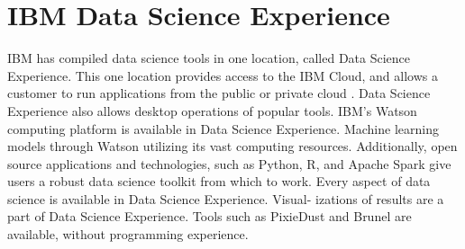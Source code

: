 \section{IBM Data Science Experience}

IBM has compiled data science tools in one location, 
called Data Science Experience. This one location provides
access to the IBM Cloud, and allows a customer to run 
applications from the public or private cloud 
\cite{hid-sp18-525-dsx}.
Data Science Experience also allows desktop operations 
of popular tools\cite{hid-sp18-525-dsx}.
IBM's Watson computing platform is available in Data Science
Experience. Machine learning models through Watson utilizing
its vast computing resources. Additionally, open source 
applications and technologies, such as Python, R, and Apache 
Spark give users a robust data science toolkit from which to
work\cite{hid-sp18-525-dsx}.
Every aspect of data science is available in Data Science 
Experience. Visual- izations of results are a part of Data 
Science Experience. Tools such as PixieDust and Brunel are 
available, without programming
experience\cite{hid-sp18-525-dsx}.

